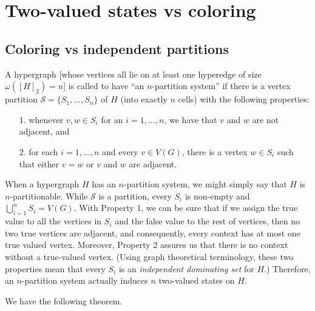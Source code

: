 \documentclass[%
12pt,
prereprint,
showpacs,
showkeys,
preprintnumbers,
amsmath,amssymb,
aps,
pra,
longbibliography,
notitlepage
]{revtex4-1}
\theoremstyle{definition}
\begin{document}
	\section{Two-valued states vs coloring}\label{color-conj}
	
	\subsection{Coloring vs independent partitions}
	A hypergraph [whose vertices all lie on at least one hyperedge of size $\omega([H]_2 )=n$] is called to have ``an $n$-partition system'' if there is a vertex partition $\mathcal{S}=\{S_1 , \ldots , S_n \}$ of $H$ (into exactly $n$ cells) with the following properties:
	\begin{itemize}
		\item[1.] whenever $v,w \in S_i$ for an $i=1,\ldots , n$, we have that $v$ and $w$ are not adjacent, and
		\item[2.] for each $i=1,\ldots , n$ and every $v \in V(G)$, there is a vertex $w \in S_i$ such that either $v =w$ or $v$ and $w$ are adjacent.
	\end{itemize}
	
	When a hypergraph $H$ has an $n$-partition system, we might simply say that $H$ is $n$-partitionable. While $\mathcal{S}$ is a partition, every $S_i$ is non-empty and $\bigcup_{i=1}^{n} S_i = V(G)$. With Property 1, we can be sure that if we assign the true value to all the vertices in $S_i$ and the false value to the rest of vertices, then no two true vertices are adjacent, and consequently, every context has at most one true valued vertex. Moreover, Property 2 assures us that there is no context without a true-valued vertex. (Using graph theoretical terminology, these two properties mean that every $S_i$ is an \emph{independent dominating set} for $H$.)  Therefore, an $n$-partition system actually induces $n$ two-valued states on $H$.%
	
	We have the following theorem.
	
\end{document}
